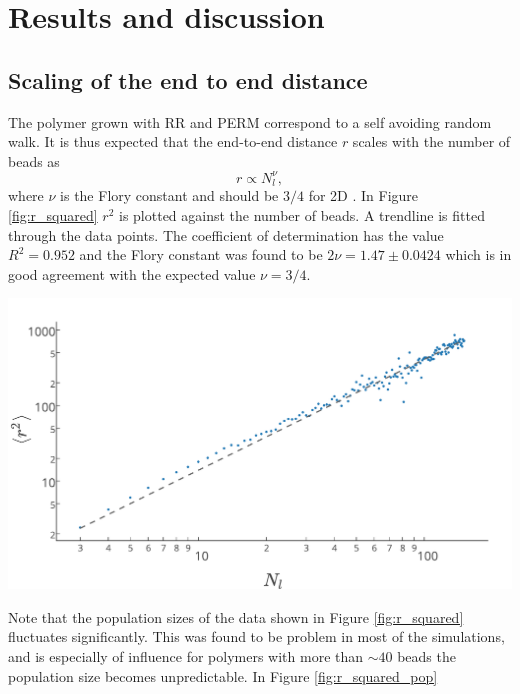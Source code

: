 \section{Results and discussion}

\subsection{Scaling of the end to end distance}
The polymer grown with RR and PERM correspond to a self avoiding random walk. It is thus expected that the end-to-end distance $r$ scales with the number of beads as 
\begin{equation*}
    r \propto N_l^\nu,
\end{equation*} where $\nu$ is the Flory constant and should be $3/4$ for 2D \cite{jmt}. In Figure \ref{fig:r_squared} $r^2$ is plotted against the number of beads. A trendline is fitted through the data points. The coefficient of determination has the value $R^2 = 0.952$ and the Flory constant was found to be $2\nu = 1.47 \pm 0.0424$ which is in good agreement with the expected value $\nu=3/4$.
\begin{Figure}
    \centering
    \includegraphics[width=\linewidth]{r_squared.pdf}
    \label{fig:r_squared}
\end{Figure}

Note that the population sizes of the data shown in Figure \ref{fig:r_squared} fluctuates significantly. This was found to be problem in most of the simulations, and is especially of influence for polymers with more than $\sim 40$ beads the population size becomes unpredictable. In Figure \ref{fig:r_squared_pop}

